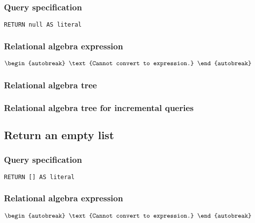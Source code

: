 \subsubsection*{Query specification}

\begin{lstlisting}
RETURN null AS literal
\end{lstlisting}

\subsubsection*{Relational algebra expression}

\begin{align*}
\begin{autobreak}
\text{Cannot convert to expression.}
\end{autobreak}
\end{align*}

\subsubsection*{Relational algebra tree}


\subsubsection*{Relational algebra tree for incremental queries}


\subsection{Return an empty list}

\subsubsection*{Query specification}

\begin{lstlisting}
RETURN [] AS literal
\end{lstlisting}

\subsubsection*{Relational algebra expression}

\begin{align*}
\begin{autobreak}
\text{Cannot convert to expression.}
\end{autobreak}
\end{align*}


